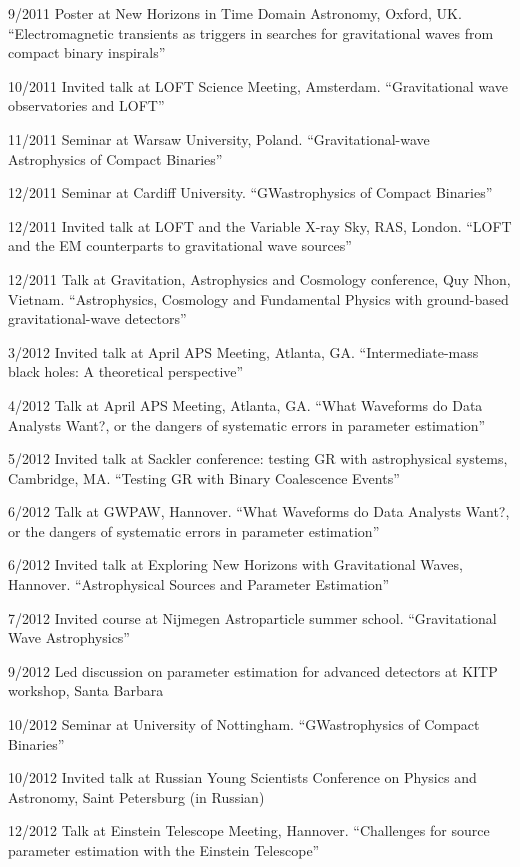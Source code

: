 \documentclass[margin,line]{res}
\begin{document}
\begin{resume}
9/2011	Poster at New Horizons in Time Domain Astronomy, Oxford, UK.  ``Electromagnetic transients as triggers in searches for gravitational waves from compact binary inspirals''

10/2011	Invited talk at LOFT Science Meeting, Amsterdam. ``Gravitational wave observatories and LOFT''

11/2011	Seminar at Warsaw University, Poland. ``Gravitational-wave Astrophysics of Compact Binaries''

12/2011	Seminar at Cardiff University. 	``GWastrophysics of Compact Binaries''

12/2011	Invited talk at LOFT and the Variable X-ray Sky, RAS, London. ``LOFT and the EM counterparts to gravitational wave sources''

12/2011	Talk at Gravitation, Astrophysics and Cosmology conference, Quy Nhon, Vietnam.  ``Astrophysics, Cosmology and Fundamental Physics with ground-based gravitational-wave detectors''

3/2012 	Invited talk at April APS Meeting, Atlanta, GA. 	``Intermediate-mass black holes: A theoretical perspective''

4/2012 	Talk 	at April APS Meeting, Atlanta, GA.  ``What Waveforms do Data Analysts Want?, or the dangers of systematic errors in parameter estimation''

5/2012 	Invited talk at Sackler conference: testing GR with astrophysical systems, Cambridge, MA. 	``Testing GR with Binary Coalescence Events''

6/2012 	Talk 	at GWPAW, Hannover.  ``What Waveforms do Data Analysts Want?, or the dangers of systematic errors in parameter estimation''

6/2012 	Invited talk at Exploring New Horizons with Gravitational Waves, Hannover.   ``Astrophysical Sources and Parameter Estimation''

7/2012	Invited course at Nijmegen Astroparticle summer school.  ``Gravitational Wave Astrophysics''

9/2012	Led discussion on parameter estimation for advanced detectors at KITP workshop, Santa Barbara

10/2012	Seminar at University of Nottingham.  ``GWastrophysics of Compact Binaries'' 

10/2012	Invited talk at Russian Young Scientists Conference on Physics and Astronomy, Saint Petersburg (in Russian)

12/2012	Talk at Einstein Telescope Meeting, Hannover.  ``Challenges for source parameter estimation with the Einstein Telescope''


\end{resume}
\end{document}
